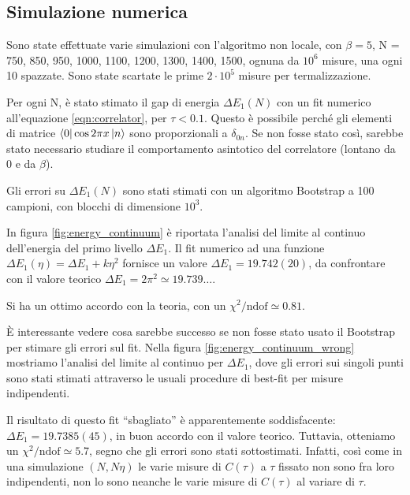 \documentclass[a4paper,11pt]{article}
\begin{document}
    \subsection{Simulazione numerica}

    Sono state effettuate varie simulazioni con l'algoritmo non locale, con $\beta = 5$, N = 750, 850, 950, 1000, 1100, 1200, 1300, 1400, 1500, ognuna da $10^6$ misure, una ogni 10 spazzate. Sono state scartate le prime $2 \cdot 10^5$ misure per termalizzazione.
    
    Per ogni N, è stato stimato il gap di energia $\Delta E_1(N)$ con un fit numerico all'equazione \ref{eqn:correlator}, per $\tau < 0.1$. Questo è possibile perché gli elementi di matrice $\bra{0}\cos 2\pi x \ket{n}$ sono proporzionali a $\delta_{0n}$. Se non fosse stato così, sarebbe stato necessario studiare il comportamento asintotico del correlatore (lontano da 0 e da $\beta$).
    
    Gli errori su $\Delta E_1(N)$ sono stati stimati con un algoritmo Bootstrap a 100 campioni, con blocchi di dimensione $10^3$.
    
    In figura \ref{fig:energy_continuum} è riportata l'analisi del limite al continuo dell'energia del primo livello $\Delta E_1$. Il fit numerico ad una funzione $\Delta E_1(\eta) = \Delta E_1 + k\eta^2$ fornisce un valore $\Delta E_1 = 19.742(20)$, da confrontare con il valore teorico $\Delta E_1 = 2\pi^2 \simeq 19.739\dots$. 
    
    Si ha un ottimo accordo con la teoria, con un $\chi^2 / \text{ndof} \simeq 0.81$.
    
    È interessante vedere cosa sarebbe successo se non fosse stato usato il Bootstrap per stimare gli errori sul fit. Nella figura \ref{fig:energy_continuum_wrong} mostriamo l'analisi del limite al continuo per $\Delta E_1$, dove gli errori sui singoli punti sono stati stimati attraverso le usuali procedure di best-fit per misure indipendenti. 
    
    Il risultato di questo fit ``sbagliato'' è apparentemente soddisfacente: $\Delta E_1 = 19.7385(45)$, in buon accordo con il valore teorico. Tuttavia, otteniamo un $\chi^2 / \text{ndof} \simeq 5.7$, segno che gli errori sono stati sottostimati. Infatti, così come in una simulazione $(N, N\eta)$ le varie misure di $C(\tau)$ a $\tau$ fissato non sono fra loro indipendenti, non lo sono neanche le varie misure di $C(\tau)$ al variare di $\tau$.   
    
    
    
\end{document}
